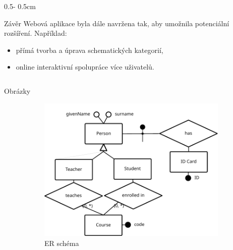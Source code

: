 \documentclass[a0paper]{uioposter}
\begin{document}
\begin{frame}
\begin{columns}[onlytextwidth]
\begin{column}{0.5\textwidth - 0.5cm}
\begin{block}{Závěr}
        Webová aplikace byla dále navržena tak, aby umožnila potenciální rozšíření.
        Například:
        \begin{itemize}
          \item přímá tvorba a úprava schematických kategorií,
          \item online interaktivní spolupráce více uživatelů.
        \end{itemize}
      \end{block}
    \end{column}
  \end{columns}
  \vskip1cm
  \begin{block}{Obrázky}
    \begin{figure}
      \centering
      \begin{subfigure}{0.3396\textwidth}
        \includegraphics[width=1\textwidth]{./images/university-er.pdf}
        \caption*{ER schéma}
      \end{subfigure}
      \begin{subfigure}{0.2604\textwidth}

\end{subfigure}
\end{figure}
\end{block}
\end{frame}
\end{document}

